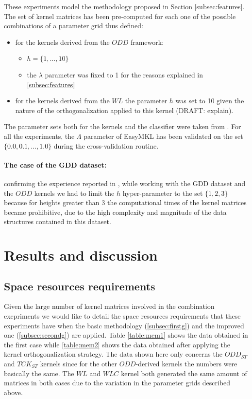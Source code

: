 These experiments model the methodology proposed in Section \ref{subsec:features}.
The set of kernel matrices has been pre-computed for each one of the possible combinations
of a parameter grid thus defined:

\begin{itemize}
    \item for the kernels derived from the $ODD$ framework:
    \begin{itemize}
        \item $h=\{1,\dots,10\}$
        \item the $\lambda$ parameter was fixed to 1 for the reasons explained in \ref{subsec:features}
    \end{itemize}
    \item for the kernels derived from the $WL$ the parameter $h$ was set to 10
        given the nature of the orthogonalization applied to this kernel (DRAFT: explain).
\end{itemize}
The parameter sets both for the kernels and the classifier were taken from \cite{rtesselli}.
For all the experiments, the $\Lambda$ parameter of EasyMKL has been
validated on the set $\{0.0, 0.1,\dots,1.0\}$ during the cross-validation
routine.

\paragraph{The case of the GDD dataset:}
\label{par:gdd}
confirming the experience reported in \cite{rtesselli}, while working with the GDD
dataset and the $ODD$ kernels we had to limit the $h$ hyper-parameter to the set
$\{1,2,3\}$ because for heights greater than 3 the computational times of the
kernel matrices became prohibitive, due to the high complexity and magnitude
of the data structures contained in this dataset.


\section{Results and discussion}
\label{sec:results}

\subsection{Space resources requirements}
Given the large number of kernel matrices involved in the combination exepriments
we would like to detail the space resources requirements that these experiments
have when the basic methodology (\ref{subsec:firstg}) and the improved one (\ref{subsec:secondg})
are applied.
Table \ref{table:mem1} shows the data obtained in the first case while \ref{table:mem2} shows
the data obtained after applying the kernel orthogonalization strategy.
The data shown here only concerns the $ODD_{ST}$ and $TCK_{ST}$ kernels since for the 
other $ODD$-derived kernels the numbers were basically the same.
The $WL$ and $WLC$ kernel both generated the same amount of matrices in both cases
due to the variation in the parameter grids described above.

